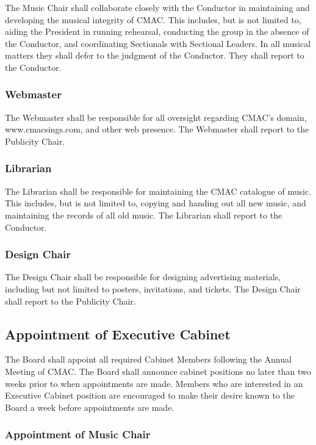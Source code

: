 \documentclass{article}
\begin{document}
The Music Chair shall collaborate closely with the Conductor in maintaining
and developing the musical integrity of CMAC. This includes, but is
not limited to, aiding the President in running rehearsal, conducting
the group in the absence of the Conductor, and coordinating Sectionals
with Sectional Leaders. In all musical matters they shall defer to the
judgment of the Conductor. They shall report to the Conductor.


\subsubsection{Webmaster}

The Webmaster shall be responsible for all oversight regarding CMAC's
domain, www.cmacsings.com, and other web presence. The Webmaster shall report to the
Publicity Chair.


\subsubsection{Librarian}

The Librarian shall be responsible for maintaining the CMAC catalogue
of music. This includes, but is not limited to, copying and handing
out all new music, and maintaining the records of all old music. The Librarian
shall report to the Conductor.


\subsubsection{Design Chair}

The Design Chair shall be responsible for designing advertising materials,
including but not limited to posters, invitations, and tickets. The Design Chair
shall report to the Publicity Chair.

\subsection{Appointment of Executive Cabinet}

The Board shall appoint all required Cabinet Members following the
Annual Meeting of CMAC. The Board shall announce cabinet positions no
later than two weeks prior to when appointments are made. Members who are
interested in an Executive Cabinet position are encouraged to make their desire
known to the Board a week before appointments are made.

\subsubsection{Appointment of Music Chair}
\end{document}
